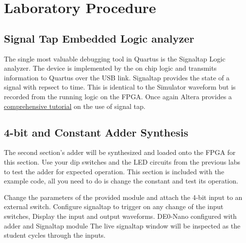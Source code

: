   \section{Laboratory Procedure}

  \subsection{Signal Tap Embedded Logic analyzer}
    The single most valuable debugging tool in Quartus is the Signaltap Logic analyzer. The device is implemented by the on chip logic and transmits information to Quartus over the USB link.  Signaltap provides the state of a signal with repsect to time. This is identical to the Simulator waveform but  is recorded from the running logic on the FPGA. Once again Altera provides a \href{ftp://ftp.altera.com/up/pub/Altera_Material/13.0/Tutorials/Verilog/SignalTap.pdf}{comprehensive tutorial} on the use of signal tap.

  \subsection{4-bit and Constant Adder Synthesis}
    The second section's adder will be synthesized and loaded onto the FPGA for this section. Use your dip switches and the LED circuits from the previous labs to test the adder for expected operation. This section is included with the example code, all you need to do is change the constant and test its operation.  

         {Change the parameters of the provided module and attach the 4-bit input to an external switch. Configure signaltap to trigger on any change of the input switches, Display the input and output waveforms.}
         {DE0-Nano configured with adder and Signaltap module}
         {The live signaltap window will be inspected as the student cycles through the inputs.}

